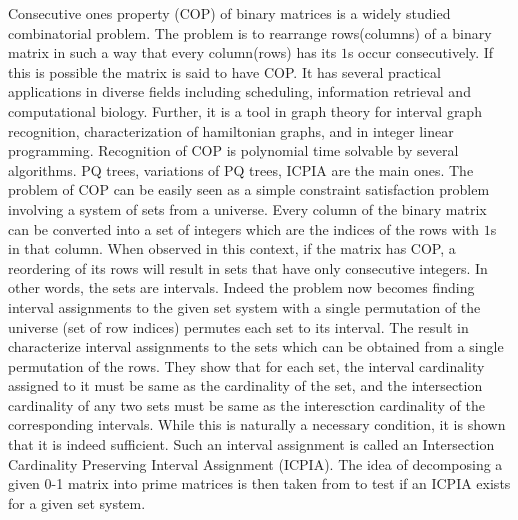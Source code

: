 \documentclass{llncs}
\begin{document}
\noindent
Consecutive ones property (COP) of binary matrices is a widely studied
combinatorial problem. The problem is to rearrange rows(columns) of a
binary matrix in such a way that every column(rows) has its $1$s occur
consecutively. If this is possible the matrix is said to have COP.  It
has several practical applications in diverse fields including
scheduling\cite{hl06}, information retrieval\cite{k77} and computational biology\cite{abh98}. 
Further, it is a tool in graph theory\cite{mcg04} for  interval graph recognition, characterization of hamiltonian graphs, and in integer linear
programming\cite{ht02,hl06}. 
Recognition of COP is polynomial time
solvable by several algorithms. PQ trees\cite{bl76}, variations of PQ
trees\cite{mm09,wlh01,wlh02,mcc04}, ICPIA\cite{nsnrs09} are the main
ones. 
\noindent
The problem of COP can be easily seen as a 
simple constraint satisfaction problem involving a system of sets from
a universe. Every column of the binary matrix can be converted into a
set of integers which are the indices of the rows with $1$s in that
column. When observed in this context, if the matrix has COP, a
reordering of its rows will result in sets that have only consecutive
integers. In other words, the sets are intervals. Indeed the
problem now becomes finding interval assignments to the given set
system \cite{nsnrs09} with a single permutation of the universe (set
of row
indices) permutes each set to its interval. The  result in \cite{nsnrs09} characterize interval assignments
to the sets which can be obtained from a single permutation of the rows.  They show that 
for each set, the interval cardinality assigned to it must be same as the cardinality of the set, and the
intersection cardinality of any two sets must be same as the interesction cardinality of the corresponding intervals.
While this is naturally a necessary condition, it is shown that it is indeed sufficient.  Such an interval assignment
is called an Intersection Cardinality Preserving Interval Assignment (ICPIA).  The idea of decomposing a given 0-1
matrix into prime matrices is then taken from \cite{wlh02} to test if an ICPIA exists for a given set system.  
\end{document}
